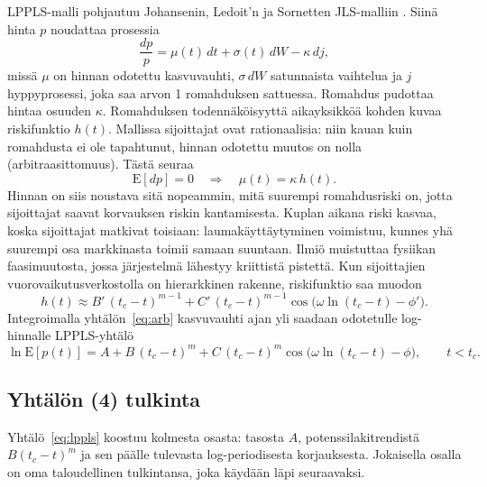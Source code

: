 \documentclass[10pt,a4paper]{article}
\newcommand{\tc}{t_c}
\begin{document}
LPPLS-malli pohjautuu Johansenin, Ledoit'n ja Sornetten JLS-malliin \citep{johansen2000}.
Siinä hinta $p$ noudattaa prosessia
\begin{equation}\label{eq:jls}
  \frac{dp}{p} = \mu(t)\,dt + \sigma(t)\,dW - \kappa\,dj,
\end{equation}
missä $\mu$ on hinnan odotettu kasvuvauhti, $\sigma\,dW$ satunnaista vaihtelua ja $j$
hyppyprosessi, joka saa arvon 1 romahduksen sattuessa. Romahdus pudottaa hintaa osuuden
$\kappa$. Romahduksen todennäköisyyttä aikayksikköä kohden kuvaa riskifunktio $h(t)$. Mallissa
sijoittajat ovat rationaalisia: niin kauan kuin romahdusta ei ole tapahtunut, hinnan odotettu
muutos on nolla (arbitraasittomuus). Tästä seuraa
\begin{equation}\label{eq:arb}
  \mathrm{E}[dp] = 0 \quad\Longrightarrow\quad \mu(t) = \kappa\, h(t).
\end{equation}
Hinnan on siis noustava sitä nopeammin, mitä suurempi romahdusriski on, jotta sijoittajat
saavat korvauksen riskin kantamisesta. Kuplan aikana riski kasvaa, koska sijoittajat matkivat
toisiaan: laumakäyttäytyminen voimistuu, kunnes yhä suurempi osa markkinasta toimii samaan
suuntaan. Ilmiö muistuttaa fysiikan faasimuutosta, jossa järjestelmä lähestyy kriittistä
pistettä. Kun sijoittajien vuorovaikutusverkostolla on hierarkkinen rakenne, riskifunktio saa
muodon
\begin{equation}\label{eq:hazard}
  h(t) \approx B'\,(\tc-t)^{m-1} + C'\,(\tc-t)^{m-1}\cos\!\bigl(\omega \ln(\tc-t) - \phi'\bigr).
\end{equation}
Integroimalla yhtälön~\eqref{eq:arb} kasvuvauhti ajan yli saadaan odotetulle log-hinnalle
LPPLS-yhtälö
\begin{equation}\label{eq:lppls}
  \ln \mathrm{E}[p(t)] = A + B\,(\tc-t)^m + C\,(\tc-t)^m \cos\!\bigl(\omega\ln(\tc-t)-\phi\bigr),
  \qquad t<\tc .
\end{equation}

\subsection{Yhtälön (4) tulkinta}\label{sec:tulkinta}

Yhtälö~\eqref{eq:lppls} koostuu kolmesta osasta: tasosta $A$, potenssilakitrendistä
$B(\tc-t)^m$ ja sen päälle tulevasta log-periodisesta korjauksesta. Jokaisella osalla on oma
taloudellinen tulkintansa, joka käydään läpi seuraavaksi.
\end{document}
